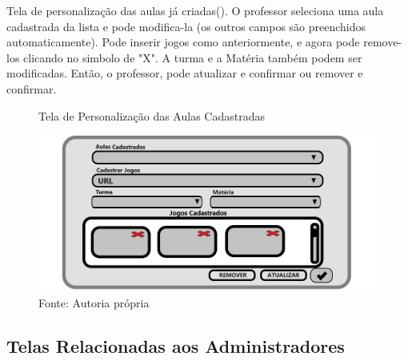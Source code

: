 \documentclass{utfpr-pg}
\begin{document}
    Tela de personalização das aulas já criadas(). O professor seleciona uma aula cadastrada da lista e pode modifica-la (os outros campos são preenchidos automaticamente). Pode inserir jogos como anteriormente, e agora pode remove-los clicando no simbolo de "X". A turma e a Matéria também podem ser modificadas. Então, o professor, pode atualizar e confirmar ou remover e confirmar.
        \begin{figure}[H]
            \centering
            \captionsetup{width=0.9\textwidth}
            \caption{Tela de Personalização das Aulas Cadastradas}
            \includegraphics[width=\linewidth]{fotos/9.jpg}
            \caption*{Fonte: Autoria própria}
            \label{fig:9}
        \end{figure}
    
    \subsection{Telas Relacionadas aos Administradores}
    
\end{document}
